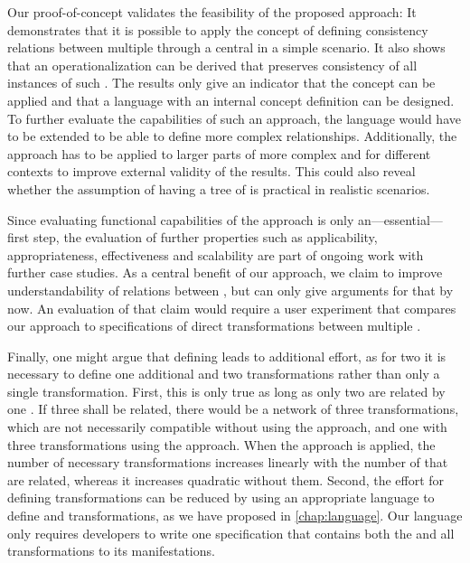 Our proof-of-concept validates the feasibility of the proposed \commonalities approach: 
It demonstrates that it is possible to apply the concept of defining consistency relations between multiple \metamodels  through a central \metamodel in a simple scenario. It also shows that an operationalization can be derived that preserves consistency of all instances of such \metamodels.
The results only give an indicator that the \commonalities concept can be applied and that a language with an internal concept definition can be designed.
To further evaluate the capabilities of such an approach, the language would have to be extended to be able to define more complex relationships.
Additionally, the approach has to be applied to larger parts of more complex \metamodels and \metamodels for different contexts to improve external validity of the results.
This could also reveal whether the assumption of having a tree of \commonalities is practical in realistic scenarios.

Since evaluating functional capabilities of the approach is only an---essential---first step, the evaluation of further properties such as applicability, appropriateness, effectiveness and scalability are part of ongoing work with further case studies.
As a central benefit of our approach, we claim to improve understandability of relations between \metamodels, but can only give arguments for that by now.
An evaluation of that claim would require a user experiment that compares our approach to specifications of direct transformations between multiple \metamodels.

Finally, one might argue that defining \conceptmetamodels leads to additional effort, as for two \metamodels it is necessary to define one additional \metamodel and two transformations rather than only a single transformation.
First, this is only true as long as only two \metamodels are related by one \conceptmetamodel. 
If three \metamodels shall be related, there would be a network of three transformations, which are not necessarily compatible without using the \commonalities approach, and one \metamodel with three transformations using the \commonalities approach.
When the \commonalities approach is applied, the number of necessary transformations increases linearly with the number of \metamodels that are related, whereas it increases quadratic without them.
Second, the effort for defining transformations can be reduced by using an appropriate language to define \conceptmetamodels and transformations, as we have proposed in \autoref{chap:language}. Our language only requires developers to write one specification that contains both the \conceptmetamodel and all transformations to its manifestations.



